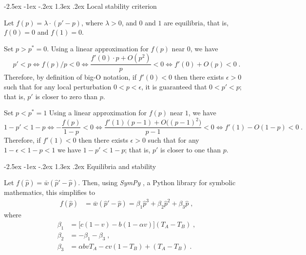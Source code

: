 \documentclass[12pt]{extarticle}
\makeatletter
\renewcommand\section{\@startsection {section}{1}{\z@}%
     {-2.5ex \@plus -1ex \@minus -.2ex}%
     {1.3ex \@plus.2ex}%
    {\Large\bfseries}}
\makeatother
\begin{document}
\begin{appendices}
\renewcommand{\theequation}{\thesection\arabic{equation}}


\section{Local stability criterion} \label{sec:appendixA}

Let $f(p)=\lambda \cdot (p'-p)$, where $\lambda>0$, and $0$ and $1$ are equilibria, that is, $f(0)=0$ and $f(1)=0$.

Set $p>p^*=0$.
Using a linear approximation for $f(p)$ near $0$, we have
\begin{equation}
p' < p \Leftrightarrow 
f(p)/p < 0 \Leftrightarrow 
\frac{f'(0) \cdot p + O(p^2)}{p} < 0 \Leftrightarrow 
f'(0) + O(p) < 0 \;.
\end{equation}
Therefore, by definition of big-O notation, if $f'(0)<0$ then there exists $\epsilon>0$ such that for any local perturbation $0<p<\epsilon$, it is guaranteed that $0<p'<p$; that is, $p'$ is closer to zero than $p$.

Set $p<p^*=1$
Using a linear approximation for $f(p)$ near $1$, we have
\begin{equation}
1-p' < 1-p  \Leftrightarrow 
-\frac{f(p)}{1-p} < 0 \Leftrightarrow 
\frac{f'(1)(p-1) + O\big((p-1)^2\big)}{p-1} < 0 \Leftrightarrow 
f'(1) - O(1-p) < 0 \;.
\end{equation}
Therefore, if $f'(1)<0$ then there exists $\epsilon>0$ such that for any $1-\epsilon<1-p<1$ we have $1-p'<1-p$; that is, $p'$ is closer to one than $p$.


\section{Equilibria and stability} \label{sec:appendixB}

Let $f(\hat{p}) = \bar{w}(\hat{p}' - \hat{p})$.
Then, using \emph{SymPy} \citep{Meurer2017}, a Python library for symbolic mathematics, this simplifies to
\begin{equation} \label{eq:general_case_polynomial}
\begin{aligned}
  f(\hat{p}) &= \bar{w}(\hat{p}'-\hat{p}) =
  \beta_1 \hat{p}^3 + \beta_2 \hat{p}^2 + \beta_3 \hat{p} \;,
\end{aligned}
\end{equation}
where 
\begin{equation} \label{eq:polynomial_coefficients}
\begin{aligned}
  \beta_1 &= \big[c(1-v) - b (1-\alpha v)\big] (T_A-T_B) \;, \\
  \beta_2 &= -\beta_1 -\beta_3 \;, \\
  \beta_3 &= \alpha bvT_A - cv(1-T_B) + (T_A-T_B) \;.
\end{aligned}
\end{equation}


\end{appendices}
\end{document}

